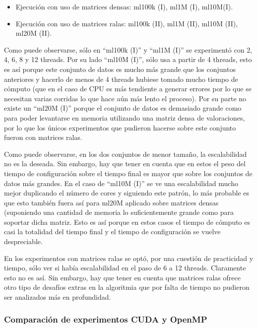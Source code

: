 \documentclass[11pt, a4paper]{article}
\begin{document}
  \begin{itemize}
      \item Ejecución con uso de matrices densas: ml100k (I), ml1M (I),
          ml10M(I).
      \item Ejecución con uso de matrices ralas: ml100k (II), ml1M (II),
          ml10M (II), ml20M (II).
  \end{itemize}

  Como puede observarse, sólo en ``ml100k (I)'' y ``ml1M (I)'' se experimentó
  con 2, 4, 6, 8 y 12 threads. Por su lado ``ml10M (I)'', sólo usa a partir de
  4 threads, esto es así porque este conjunto de datos es mucho más grande que
  los conjuntos anteriores y hacerlo de menos de 4 threads hubiese tomado mucho
  tiempo de cómputo (que en el caso de CPU es más tendiente a generar errores
  por lo que se necesitan varias corridas lo que hace aún más lento el
  proceso). Por su parte no existe un ``ml20M (I)'' porque el conjunto de datos
  es demasiado grande como para poder levantarse en memoria utilizando una
  matriz densa de valoraciones, por lo que los únicos experimentos que pudieron
  hacerse sobre este conjunto fueron con matrices ralas.

  Como puede observarse, en los dos conjuntos de menor tamaño, la escalabilidad
  no es la deseada. Sin embargo, hay que tener en cuenta que en estos el peso
  del tiempo de configuración sobre el tiempo final es mayor que sobre los
  conjuntos de datos más grandes. En el caso de ``ml10M (I)'' se ve una
  escalabilidad mucho mejor duplicando el número de cores y siguiendo este
  patrón, lo más probable es que esto también fuera así para ml20M aplicado
  sobre matrices densas (suponiendo una cantidad de memoria lo suficientemente
  grande como para soportar dicha matriz. Esto es así porque en estos casos el
  tiempo de cómputo es casi la totalidad del tiempo final y el tiempo de
  configuración se vuelve despreciable.

  En los experimentos con matrices ralas se optó, por una cuestión de
  practicidad y tiempo, sólo ver si había escalabilidad en el paso de 6 a 12
  threads. Claramente esto no es así. Sin embargo, hay que tener en cuenta que
  matrices ralas ofrece otro tipo de desafíos extras en la algoritmia que por
  falta de tiempo no pudieron ser analizados más en profundidad.

  \subsubsection{Comparación de experimentos CUDA y OpenMP}
  
\end{document}
